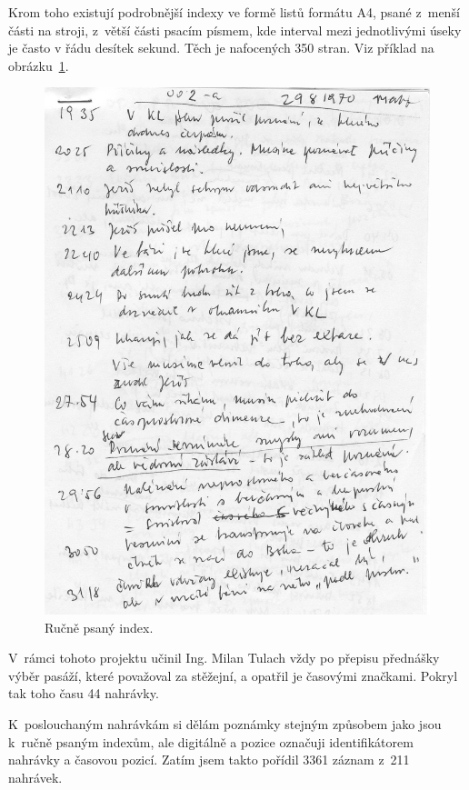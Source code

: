 Krom toho existují podrobnější indexy ve formě listů
formátu A4, psané z~menší části na stroji, z~větší části psacím písmem, kde
interval mezi jednotlivými úseky je často v řádu desítek sekund. Těch je
nafocených 350 stran. Viz příklad na obrázku~\ref{fig:index-rucni}.

\begin{figure}[htpb]
\includegraphics[scale=0.95]{rc/index-rucni.jpg}
\caption{Ručně psaný index.}
\label{fig:index-rucni}
\end{figure}

V~rámci tohoto projektu učinil Ing. Milan Tulach vždy po přepisu přednášky výběr
pasáží, které považoval za stěžejní, a opatřil je časovými značkami.
Pokryl tak toho času 44 nahrávky.

K~poslouchaným nahrávkám si dělám poznámky stejným způsobem jako jsou k~ručně psaným
indexům, ale digitálně a pozice označuji identifikátorem
nahrávky a časovou pozicí. Zatím jsem takto pořídil 3361 záznam z~211 nahrávek.

